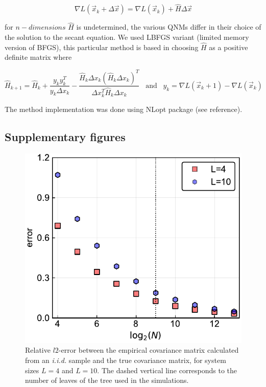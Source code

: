\documentclass[preprint,amsmath,amssymb,superscriptaddress,showpacs,pre]{revtex4-1}
\begin{document}
$$\nabla L(\vec{x}_k+\Delta\vec{x})=\nabla L(\vec{x}_k)+\hat{H} \Delta\vec{x} $$


for $n-dimensions$ $\hat{H}$ is undetermined, the various QNMs differ in their choice of the solution to the secant equation. We used LBFGS variant  (limited memory version of BFGS), this particular method is based in choosing $\hat{H}$ as a positive definite matrix where

$$\hat{H}_{k+1}=\hat{H}_{k}+\frac{y_k y^{T}_k}{y_k\Delta x_k} - \frac{\hat{H}_k\Delta x_k(\hat{H}_k\Delta x_k)^T}{\Delta x^T_k\hat{H}_k\Delta x_k} \;\;\;\text{and}\;\;\; y_k=\nabla L(\vec{x}_k+1)-\nabla L(\vec{x}_k)$$

The method implementation was done using   NLopt package (see reference).
 
\subsection{Supplementary figures}
\label{sub:supplementary_figures}

\begin{figure}[!htb]
	\centering
	\includegraphics[keepaspectratio=true,width=1.0\textwidth]{Figures/error_Ciid_vs_numb_of_seq.pdf}
	\caption{Relative $l2$-error between the empirical covariance matrix calculated from an \emph{i.i.d.} sample and the true covariance matrix, for system sizes $L=4$ and $L=10$. The dashed vertical line corresponds to the number of leaves of the tree used in the simulations.}
	\label{fig:error_vs_nseqs}
\end{figure}
\end{document}
